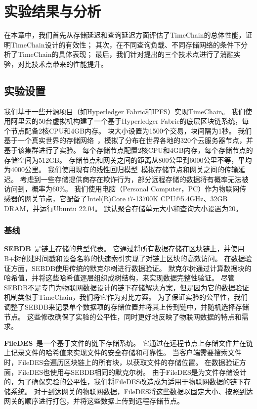 \chapter{实验结果与分析}
在本章中，我们首先从存储延迟和查询延迟方面评估了TimeChain的总体性能，证明TimeChain设计的有效性；
其次，在不同查询负载、不同存储网络的条件下分析了TimeChain的具体表现；
最后，我们针对提出的三个技术点进行了消融实验，对比技术点带来的性能提升。

\section{实验设置}
我们基于一些开源项目（如Hyperledger Fabric和IPFS）实现TimeChain。
我们使用阿里云的50台虚拟机构建了一个基于Hyperledger Fabric的底层区块链系统，每个节点配备2核CPU和4GB内存。
块大小设置为1500个交易，块间隔为1秒。
我们基于一个真实世界的存储网络~\cite{corneo2021surrounded}，模拟了分布在世界各地的320个云服务器节点，并基于该集群进行了实验。
每个存储节点配置2核CPU和4GB内存，每个存储节点的存储空间为512GB。
存储节点和网关之间的距离从800公里到6000公里不等，平均为4000公里。
我们使用现有的线性回归模型~\cite{ziviani2005improving}模拟存储节点和网关之间的传输延迟。
考虑到一些存储提供商存在欺诈行为，部分远程存储的数据将有概率无法被访问到，概率为60\%。
我们使用电脑（Personal Computer，PC）作为物联网传感器的网关节点，它配备了Intel(R)Core i7-13700K CPU@5.4GHz、32GB DRAM，并运行Ubuntu 22.04。
默认聚合存储单元大小和查询大小设置为20。

\subsection{基线}
\textbf{SEBDB}~\cite{zhu2019sebdb}是链上存储的典型代表。
它通过将所有数据存储在区块链上，并使用B+树创建时间戳和设备名称的快速索引实现了对链上区块的高效访问。
在数据验证方面，SEBDB使用传统的默克尔树进行数据验证。
默克尔树通过计算数据块的哈希值，并将这些哈希值逐层组织成树结构，来实现数据完整性验证。
尽管SEBDB不是专门为物联网数据设计的链下存储解决方案，但是因为它的数据验证机制类似于TimeChain，我们将它作为对比方案。
为了保证实验的公平性，我们调整了SEBDB来记录单个数据项的存储位置并将其上传到链中，并随机选择存储节点。
这些修改确保了实验的公平性，同时更好地反映了物联网数据的特点和需求。

\textbf{FileDES}~\cite{xu2024filedes}是一个基于文件的链下存储系统。
它通过在远程节点上存储文件并在链上记录文件的哈希值来实现文件的安全存储和可靠性。
当客户端需要搜索文件时，FileDES会遍历区块链上的所有块，以获取文件的存储位置。
在数据验证方面，FileDES也使用与SEBDB相同的默克尔树。
由于FileDES是为文件存储设计的，为了确保实验的公平性，我们将FileDES改造成为适用于物联网数据的链下存储系统。
对于到达网关的物联网数据，FileDES将这些数据以固定大小、按照到达网关的顺序进行打包，并将这些数据上传到远程存储节点。

